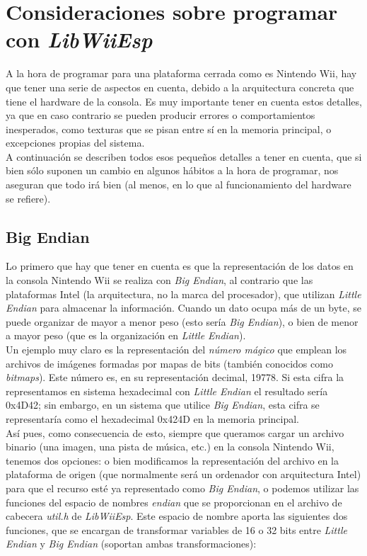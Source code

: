\section{Consideraciones sobre programar con \emph{LibWiiEsp}}

A la hora de programar para una plataforma cerrada como es Nintendo Wii, hay que tener una serie de aspectos en cuenta, debido a la arquitectura concreta que tiene el hardware de la consola. Es muy importante tener en cuenta estos detalles, ya que en caso contrario se pueden producir errores o comportamientos inesperados, como texturas que se pisan entre sí en la memoria principal, o excepciones propias del sistema. \\

A continuación se describen todos esos pequeños detalles a tener en cuenta, que si bien sólo suponen un cambio en algunos hábitos a la hora de programar, nos aseguran que todo irá bien (al menos, en lo que al funcionamiento del hardware se refiere).

\subsection{Big Endian}

Lo primero que hay que tener en cuenta es que la representación de los datos en la consola Nintendo Wii se realiza con \emph{Big Endian}, al contrario que las plataformas Intel (la arquitectura, no la marca del procesador), que utilizan \emph{Little Endian} para almacenar la información. Cuando un dato ocupa más de un byte, se puede organizar de mayor a menor peso (esto sería \emph{Big Endian}), o bien de menor a mayor peso (que es la organización en \emph{Little Endian}). \\

Un ejemplo muy claro es la representación del \emph{número mágico} que emplean los archivos de imágenes formadas por mapas de bits (también conocidos como \emph{bitmaps}). Este número es, en su representación decimal, 19778. Si esta cifra la representamos en sistema hexadecimal con \emph{Little Endian} el resultado sería 0x4D42; sin embargo, en un sistema que utilice \emph{Big Endian}, esta cifra se representaría como el hexadecimal 0x424D en la memoria principal. \\

Así pues, como consecuencia de esto, siempre que queramos cargar un archivo binario (una imagen, una pista de música, etc.) en la consola Nintendo Wii, tenemos dos opciones: o bien modificamos la representación del archivo en la plataforma de origen (que normalmente será un ordenador con arquitectura Intel) para que el recurso esté ya representado como \emph{Big Endian}, o podemos utilizar las funciones del espacio de nombres \emph{endian} que se proporcionan en el archivo de cabecera \emph{util.h} de \emph{LibWiiEsp}. Este espacio de nombre aporta las siguientes dos funciones, que se encargan de transformar variables de 16 o 32 bits entre \emph{Little Endian} y \emph{Big Endian} (soportan ambas transformaciones):

